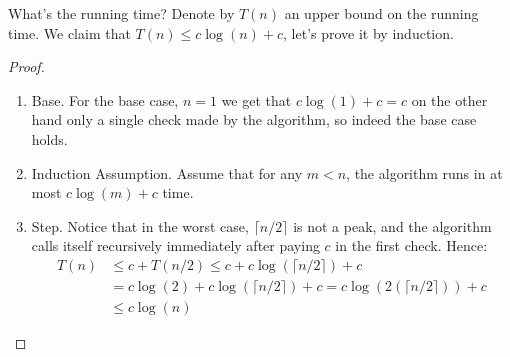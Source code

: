 

What's the running time? Denote by $T\left( n \right)$ an upper bound on the running time. We claim that $T(n) \le c \log (n) + c$, let's prove it by induction.
\begin{proof}
     
\begin{enumerate}
  \item Base. For the base case, $n=1$ we get that $c \log(1) + c =  c$ on the other hand only a single check made by the algorithm, so indeed the base case holds.
  \item Induction Assumption. Assume that for any $m < n$, the algorithm runs in at most $c \log(m) + c$ time.
  \item Step. Notice that in the worst case, $\lceil n/2 \rceil$ is not a peak, and the algorithm calls itself recursively immediately after paying $c$ in the first check. Hence: \begin{equation*}
      \begin{split}    
    T\left(n\right) & \le c + T\left(n/2\right) \le c + c \log\left( \lceil n/2 \rceil \right) + c\\
  & = c \log (2) +  c \log\left( \lceil n/2 \rceil  \right) + c = c \log\left(2 \left(\lceil n/2 \rceil \right) \right) + c\\
  & \le c \log \left( n  \right)    
      \end{split}
    \end{equation*}
\end{enumerate}
\end{proof}




